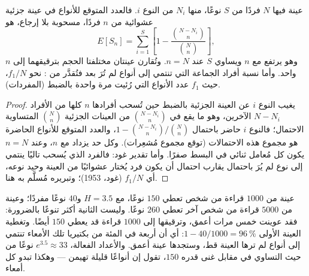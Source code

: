 \begin{theorem}[الترقيق]\label{thm:b3:microbiomes:rarefaction}
عينة فيها $N$ فردًا من $S$ نوعًا، منها $N_{i}$ من النوع
$i$. فالعدد المتوقع للأنواع في عينة جزئية عشوائية من $n$
فردًا، مسحوبة بلا إرجاع، هو
\[
E[S_{n}] = \sum_{i=1}^{S}\left[1 - \frac{\binom{N - N_{i}}{n}}
{\binom{N}{n}}\right],
\]
وهو يرتفع مع $n$ ويساوي $S$ عند $n = N$. وتُقارن عينتان
مختلفتا الحجم بترقيقهما إلى $n$ واحد. وأما نسبة أفراد
الجماعة التي تنتمي إلى أنواع لم تُرَ بعد فتُقدَّر من
\emph{}: نحو $f_{1}/N$، حيث $f_{1}$ عدد الأنواع
التي رُئيت مرة واحدة بالضبط (المفردات).
\end{theorem}
\begin{proof}
يغيب النوع $i$ عن العينة الجزئية بالضبط حين تُسحب أفرادها
$n$ كلها من الأفراد $N - N_{i}$ الآخرين، وهو ما يقع في
$\binom{N - N_{i}}{n}$ من العينات الجزئية $\binom{N}{n}$
المتساوية الاحتمال؛ فالنوع $i$ حاضر باحتمال $1 - \binom{N-N_{i}}{n}/
\binom{N}{n}$، والعدد المتوقع للأنواع الحاضرة هو مجموع هذه
الاحتمالات (توقع مجموع مُشعِرات). وكل حد يزداد مع $n$، وعند
$n = N$ يكون كل مُعامل ثنائي في البسط صفرًا. وأما تقدير
غود: فالفرد الذي يُسحب تاليًا ينتمي إلى نوع لم يُرَ
باحتمال يقارب احتمال أن يكون فرد يُختار عشوائيًا من العينة
وحيد نوعه، أي $f_{1}/N$ (غود، 1953)؛ وتبريره مُسلَّم به
هنا.
\end{proof}

\begin{example}\label{ex:b3:microbiomes:two-guts}
عينة من $1000$ قراءة من شخص تعطي $150$ نوعًا، مع
$H = 3.5$ و$40$ نوعًا مفردًا؛ وعينة من $5000$ قراءة من شخص
آخر تعطي $260$ نوعًا. وليست الثانية أكثر تنوعًا بالضرورة:
فقد عوينت خمس مرات أعمق، وترقيقها إلى $1000$ قراءة قد يعطي
$150$ أيضًا. وتغطية العينة الأولى $1 - 40/1000 =
\qty{96}{\%}$: أي أن أربعة في المئة من بكتيريا تلك الأمعاء
تنتمي إلى أنواع لم ترها العينة قط، وستجدها عينة أعمق.
والأعداد الفعالة، $e^{3.5} \approx 33$ نوعًا من حيث
التساوي في مقابل غنى قدره $150$، تقول إن أنواعًا قليلة
تهيمن --- وهكذا تبدو كل أمعاء.
\end{example}

